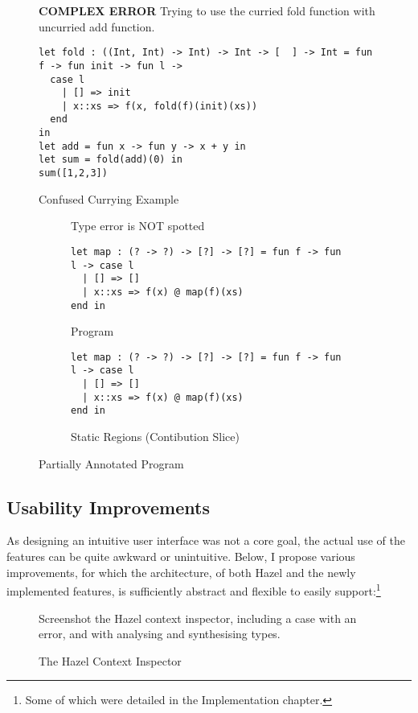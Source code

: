 \begin{figure}
\textbf{COMPLEX ERROR}
Trying to use the curried fold function with uncurried add function.
\begin{lstlisting}
let fold : ((Int, Int) -> Int) -> Int -> [  ] -> Int = fun f -> fun init -> fun l -> 
  case l 
    | [] => init 
	| x::xs => f(x, fold(f)(init)(xs)) 
  end 
in
let add = fun x -> fun y -> x + y in
let sum = fold(add)(0) in
sum([1,2,3])
\end{lstlisting}
\caption{Confused Currying Example}
\label{fig:TastyCurry}
\end{figure}


\begin{figure}
\begin{subfigure}{.5\textwidth}
\centering
Type error is NOT spotted
\begin{lstlisting}
let map : (? -> ?) -> [?] -> [?] = fun f -> fun l -> case l 
  | [] => []
  | x::xs => f(x) @ map(f)(xs) 
end in   
\end{lstlisting}
\caption{Program}
\end{subfigure}

\begin{subfigure}{.5\textwidth}\centering
\begin{lstlisting}
let map : (? -> ?) -> [?] -> [?] = fun f -> fun l -> case l 
  | [] => []
  | x::xs => f(x) @ map(f)(xs) 
end in   
\end{lstlisting}
\caption{Static Regions (Contibution Slice)}
\end{subfigure}
\caption{Partially Annotated Program}
\label{fig:HalfAnnotated}
\end{figure}

\subsection{Usability Improvements}
As designing an intuitive user interface was not a core goal, the actual use of the features can be quite awkward or unintuitive. Below, I propose various improvements, for which the architecture, of both Hazel and the newly implemented features, is sufficiently abstract and flexible to easily support:\footnote{Some of which were detailed in the Implementation chapter.}

\begin{figure}\centering
Screenshot the Hazel context inspector, including a case with an error, and with analysing and synthesising types.
\caption{The Hazel Context Inspector}
\label{fig:ContextInspector}
\end{figure}

